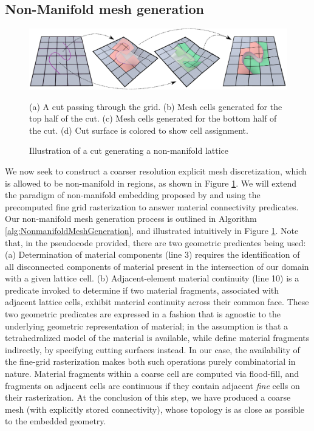 \subsection{Non-Manifold mesh generation}
\label{sec:nonmanifoldmeshgeneration}

\begin{figure}
  \centering
  \includegraphics[width=.9\textwidth]{chapter_gridiron/images/New_HybridLattice2.pdf}
\caption{Illustration of a cut generating a non-manifold lattice}{ (a) A cut
  passing through the grid. (b) Mesh cells generated for the top half
  of the cut. (c) Mesh cells generated for the bottom half of the
  cut. (d) Cut surface is colored to show cell assignment.}
\label{Fig:MaterialContinuity}
\end{figure}

We now seek to construct a coarser resolution explicit mesh
discretization, which is allowed to be non-manifold in regions, as
shown in Figure \ref{Fig:MaterialContinuity}. We will extend the
paradigm of non-manifold embedding proposed by
\citet{TeranSBNLF:2005} and 
\citet{SifakDF:2007} using the precomputed fine grid rasterization
to answer material connectivity predicates. Our non-manifold mesh
generation process is outlined in Algorithm
\ref{alg:NonmanifoldMeshGeneration}, and illustrated intuitively in
Figure \ref{Fig:MaterialContinuity}. Note that, in the pseudocode
provided, there are two geometric predicates being used: (a)
Determination of material components (line 3) requires the
identification of all disconnected components of material present in
the intersection of our domain with a given lattice cell. (b)
Adjacent-element material continuity (line 10) is a predicate invoked
to determine if two material fragments, associated with adjacent
lattice cells, exhibit material continuity across their common
face. These two geometric predicates are expressed in a fashion that
is agnostic to the underlying geometric representation of material; in
\citet{TeranSBNLF:2005} the assumption is that a
tetrahedralized model of the material is available, while \citet{SifakDF:2007} define material fragments indirectly,
by specifying cutting surfaces instead. In our case, the availability
of the fine-grid rasterization makes both such operations purely
combinatorial in nature. Material fragments within a coarse cell are
computed via flood-fill, and fragments on adjacent cells are
continuous if they contain adjacent \emph{fine} cells on their
rasterization. At the conclusion of this step, we have produced a
coarse mesh (with explicitly stored connectivity), whose topology is
as close as possible to the embedded geometry.

